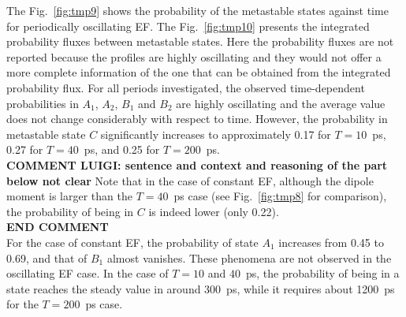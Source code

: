 \documentclass[a4paper,preprint,unsortedaddress,onecolumn]{revtex4-1}
\begin{document}
The Fig.~\ref{fig:tmp9} shows the probability of the
metastable states against time for periodically oscillating EF.  The
Fig.~\ref{fig:tmp10} presents the integrated probability fluxes between
metastable states. Here the probability fluxes are not reported
because the profiles are highly oscillating and they would not offer 
 a more complete information of the one that can be obtained from the integrated probability flux.
For all periods investigated,
the observed time-dependent probabilities  in $A_1$, $A_2$, $B_1$ and $B_2$ are
highly oscillating and the average value does not change
considerably with respect to time.
However, the probability in metastable state $C$ significantly
increases to approximately 0.17 for $T=10$~ps, 0.27 for  $T=40$~ps, and
0.25 for $T=200$~ps.\\
{\bf COMMENT LUIGI: sentence and context and reasoning of the part below not clear}
Note that in the case of constant EF, although the dipole moment is
larger than the  $T=40$~ps case (see Fig.~\ref{fig:tmp8} for comparison), the
probability of being in $C$ is indeed lower (only 0.22).\\
{\bf END COMMENT}\\
For the case of constant EF, the probability of state $A_1$
increases from 0.45 to 0.69, and that of $B_1$ almost vanishes.
These phenomena are not observed in the oscillating EF case.
In the case of $T=10$ and $40$~ps, the probability of being in a state
reaches the steady value in around 300~ps, while it requires about 1200~ps
for the $T=200$~ps case. 
\end{document}
